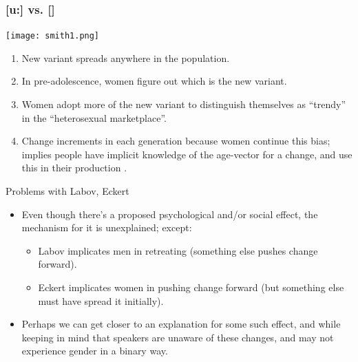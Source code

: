 \documentclass[hyperref={pdfpagelabels=false}]{beamer}
\begin{document}
\begin{frame}
\frametitle{[u:] vs. [] \citep{smithetal2007}}
\begin{center}
\texttt{[image: smith1.png]}
\end{center}
\end{frame}

\begin{frame}{\citet{eckert2011}}
	\begin{enumerate}
	\item New variant spreads anywhere in the population.
	\item In pre-adolescence, women figure out which is the new variant.
	\item Women adopt more of the new variant to distinguish themselves as ``trendy'' in the ``heterosexual marketplace''.
	\item Change increments in each generation because women continue this bias; implies people have implicit knowledge of the age-vector for a change, and use this in their production \citep[weak evidence from][]{drager2011}.
	\end{enumerate}
\end{frame}

\begin{frame}{Problems with Labov, Eckert}
	\begin{itemize}
	\item Even though there's a proposed psychological and/or social effect, the mechanism for it is unexplained; except:
		\begin{itemize}
		\item Labov implicates men in retreating (something else pushes change forward).
		\item Eckert implicates women in pushing change forward (but something else must have spread it initially).
		\end{itemize}
	\item Perhaps we can get closer to an explanation for some such effect, and while keeping in mind that speakers are unaware of these changes, and may not experience gender in a binary way.
	\end{itemize}
\end{frame}
\end{document}
